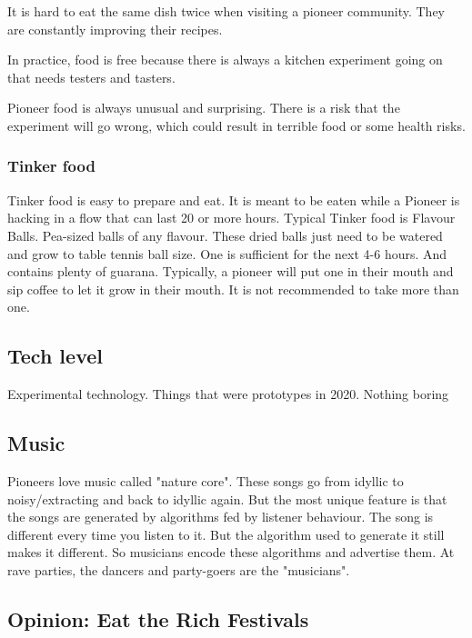 It is hard to eat the same dish twice when visiting a pioneer community. They are constantly improving their recipes.

In practice, food is free because there is always a kitchen experiment going on that needs testers and tasters.

Pioneer food is always unusual and surprising. There is a risk that the experiment will go wrong, which could result in terrible food or some health risks.

\subsubsection{Tinker food}

Tinker food is easy to prepare and eat. It is meant to be eaten while a Pioneer is hacking in a flow that can last 20 or more hours. Typical Tinker food is Flavour Balls. Pea-sized balls of any flavour. These dried balls just need to be watered and grow to table tennis ball size. One is sufficient for the next 4-6 hours. And contains plenty of guarana.
Typically, a pioneer will put one in their mouth and sip coffee to let it grow in their mouth. It is not recommended to take more than one.

\subsection{Tech level}

Experimental technology. Things that were prototypes in 2020. Nothing boring

\subsection{Music}

Pioneers love music called "nature core". These songs go from idyllic to noisy/extracting and back to idyllic again. But the most unique feature is that the songs are generated by algorithms fed by listener behaviour.
The song is different every time you listen to it. But the algorithm used to generate it still makes it different. So musicians encode these algorithms and advertise them. At rave parties, the dancers and party-goers are the "musicians".

\subsection{Opinion: Eat the Rich Festivals}

